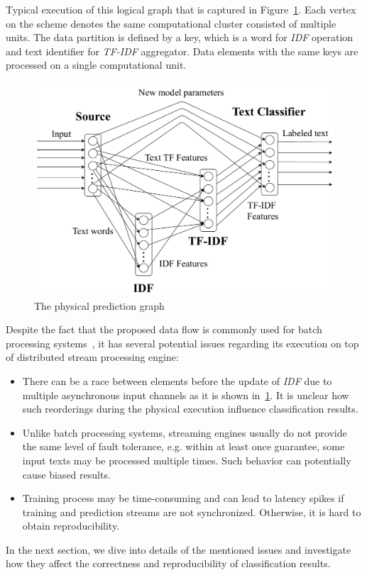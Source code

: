 Typical execution of this logical graph that is captured in Figure~\ref{physical_graph}. Each vertex on the scheme denotes the same computational cluster consisted of multiple units. The data partition is defined by a key, which is a word for {\em IDF} operation and text identifier for {\em TF-IDF} aggregator. Data elements with the same keys are processed on a single computational unit.

\begin{figure}[htbp]
  \centering
  \includegraphics[scale=0.375]{pics/physical-graph}
  \caption{The physical prediction graph}
  \label {physical_graph}
\end{figure}

Despite the fact that the proposed data flow is commonly used for batch processing systems~\cite{semberecki2016distributed}, it has several potential issues regarding its execution on top of distributed stream processing engine:

\begin{itemize}
    \item There can be a race between elements before the update of {\em IDF} due to multiple asynchronous input channels as it is shown in~\ref{physical_graph}. It is unclear how such reorderings during the physical execution influence classification results.
    \item Unlike batch processing systems, streaming engines usually do not provide the same level of fault tolerance, e.g. within at least once guarantee, some input texts may be processed multiple times. Such behavior can potentially cause biased results.
    \item Training process may be time-consuming and can lead to latency spikes if training and prediction streams are not synchronized. Otherwise, it is hard to obtain reproducibility.
\end{itemize}

In the next section, we dive into details of the mentioned issues and investigate how they affect the correctness and reproducibility of classification results.